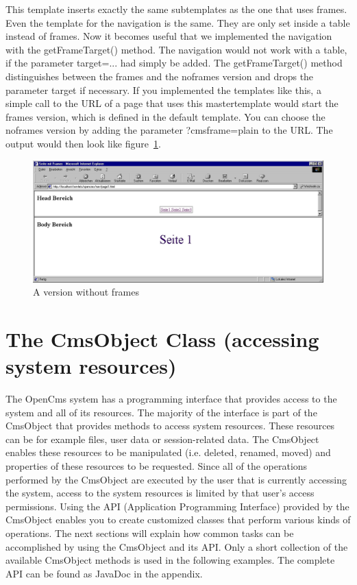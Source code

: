 This template inserts exactly the same subtemplates as the one that uses frames. Even the
template for the navigation is the same. They are only set inside a table instead of frames.
Now it becomes useful that we implemented the navigation with the {\meth getFrameTarget()} 
method.
The navigation would not work with a table, if the parameter {\tag target=...} had
simply be added. The {\meth getFrameTarget()} method distinguishes between the frames and
the noframes version and drops the parameter {\name target} if necessary. 
If you implemented the templates like this, a simple call to the URL of a page that 
uses this mastertemplate would start the frames version, which is defined in
the default template. 
You can choose the noframes version by adding the parameter {\name ?cmsframe=plain}
to the URL. The output would then look like figure~\ref{noFrames}.

\begin{figure}[hbt]
\begin{center}
\includegraphics[width=\sgw]
                   {pics/templateMech/frames_2}
\caption[A version without frames]
           {A version without frames}
\label{noFrames}
\end{center}
\end{figure}

\section{The CmsObject Class (accessing system resources)}

The OpenCms system has a programming interface that provides access to the
system and all of its resources. The majority of the interface is part
of the {\name CmsObject} that provides methods to access system resources.
These resources can be for example files, user data or session-related
data. The {\name CmsObject} enables these resources to be manipulated (i.e.
deleted, renamed, moved) and properties of these resources to be
requested. Since all of the operations performed by the {\name CmsObject} are
executed by the user that is currently accessing the system, access to
the system resources is limited by that user's access permissions.
Using the API (Application Programming Interface) provided by the
{\name CmsObject} enables you to create customized classes that perform various
kinds of operations.
The next sections will explain how common tasks can be accomplished by
using the {\name CmsObject} and its API. Only a short collection of the
available {\name CmsObject} methods is used in the following examples. The
complete API can be found as JavaDoc in the appendix.

